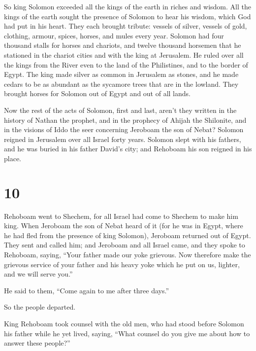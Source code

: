  So king Solomon exceeded all the kings of the earth in
riches and wisdom.  All the kings of the earth sought the
presence of Solomon to hear his wisdom, which God had put in his heart.
 They each brought tribute: vessels of silver, vessels of
gold, clothing, armour, spices, horses, and mules every year.
 Solomon had four thousand stalls for horses and
chariots, and twelve thousand horsemen that he stationed in the chariot
cities and with the king at Jerusalem.  He ruled over all
the kings from the River even to the land of the Philistines, and to the
border of Egypt.  The king made silver as common in
Jerusalem as stones, and he made cedars to be as abundant as the
sycamore trees that are in the lowland.  They brought
horses for Solomon out of Egypt and out of all lands.

 Now the rest of the acts of Solomon, first and last,
aren't they written in the history of Nathan the prophet, and in the
prophecy of Ahijah the Shilonite, and in the visions of Iddo the seer
concerning Jeroboam the son of Nebat?  Solomon reigned in
Jerusalem over all Israel forty years.  Solomon slept
with his fathers, and he was buried in his father David's city; and
Rehoboam his son reigned in his place.

\hypertarget{section-9}{%
\section{10}\label{section-9}}

 Rehoboam went to Shechem, for all Israel had come to
Shechem to make him king.  When Jeroboam the son of Nebat
heard of it (for he was in Egypt, where he had fled from the presence of
king Solomon), Jeroboam returned out of Egypt.  They sent
and called him; and Jeroboam and all Israel came, and they spoke to
Rehoboam, saying,  ``Your father made our yoke grievous.
Now therefore make the grievous service of your father and his heavy
yoke which he put on us, lighter, and we will serve you.''

 He said to them, ``Come again to me after three days.''

So the people departed.

 King Rehoboam took counsel with the old men, who had
stood before Solomon his father while he yet lived, saying, ``What
counsel do you give me about how to answer these people?''

